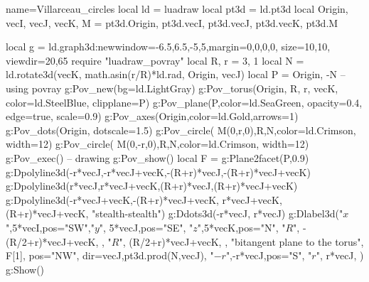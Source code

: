 \begin{luadraw}{name=Villarceau_circles}
local ld = luadraw
local pt3d = ld.pt3d
local Origin, vecI, vecJ, vecK, M = pt3d.Origin, pt3d.vecI, pt3d.vecJ, pt3d.vecK, pt3d.M

local g = ld.graph3d:new{window={-6.5,6.5,-5,5},margin={0,0,0,0}, size={10,10}, viewdir={20,65}}
require "luadraw_povray"
local R, r = 3, 1
local N = ld.rotate3d(vecK, math.asin(r/R)*ld.rad, {Origin, vecJ})
local P = {Origin, -N}
-- using povray
g:Pov_new({bg=ld.LightGray})
g:Pov_torus(Origin, R, r, vecK, {color=ld.SteelBlue, clipplane=P})
g:Pov_plane(P,{color=ld.SeaGreen, opacity=0.4, edge=true, scale=0.9})
g:Pov_axes(Origin,{color=ld.Gold,arrows=1})
g:Pov_dots(Origin, {dotscale=1.5})
g:Pov_circle( M(0,r,0),R,N,{color=ld.Crimson, width=12})
g:Pov_circle( M(0,-r,0),R,N,{color=ld.Crimson, width=12})
g:Pov_exec()
-- drawing
g:Pov_show()
local F = g:Plane2facet(P,0.9)
g:Dpolyline3d({{-r*vecJ,-r*vecJ+vecK},{-(R+r)*vecJ,-(R+r)*vecJ+vecK}})
g:Dpolyline3d({{r*vecJ,r*vecJ+vecK},{(R+r)*vecJ,(R+r)*vecJ+vecK}})
g:Dpolyline3d({{-r*vecJ+vecK,-(R+r)*vecJ+vecK}, {r*vecJ+vecK,(R+r)*vecJ+vecK}}, "stealth-stealth")
g:Ddots3d({-r*vecJ, r*vecJ})
g:Dlabel3d("$x$",5*vecI,{pos="SW"},"$y$", 5*vecJ,{pos="SE"}, "$z$",5*vecK,{pos="N"},
  "$R$", -(R/2+r)*vecJ+vecK, {}, "$R$", (R/2+r)*vecJ+vecK, {},
  "bitangent plane to the torus", F[1], {pos="NW", dir={vecJ,pt3d.prod(N,vecJ)}},
  "$-r$",-r*vecJ,{pos="S"}, "$r$", r*vecJ,{} )
g:Show()
\end{luadraw}
